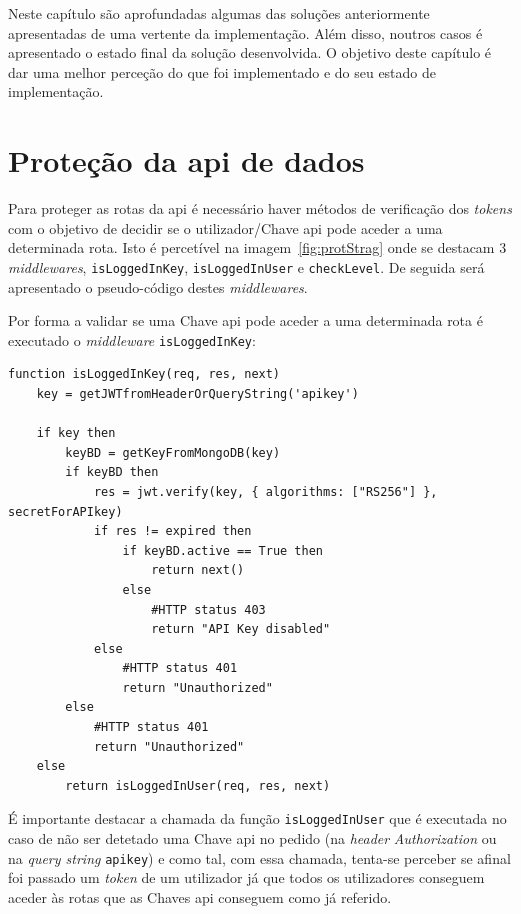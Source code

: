 Neste capítulo são aprofundadas algumas das soluções anteriormente apresentadas de uma vertente da implementação. Além disso, noutros casos é apresentado o estado final da solução desenvolvida. O objetivo deste capítulo é dar uma melhor perceção do que foi implementado e do seu estado de implementação.

\section{Proteção da \acrshort{api} de dados}

Para proteger as rotas da \acrshort{api} é necessário haver métodos de verificação dos \textit{tokens} com o objetivo de decidir se o utilizador/Chave \acrshort{api} pode aceder a uma determinada rota. Isto é percetível na imagem~\ref{fig:protStrag} onde se destacam 3 \textit{middlewares}, \texttt{isLoggedInKey}, \texttt{isLoggedInUser} e \texttt{checkLevel}. De seguida será apresentado o pseudo-código destes \textit{middlewares}. 

Por forma a validar se uma Chave \acrshort{api} pode aceder a uma determinada rota é executado o \textit{middleware} \texttt{isLoggedInKey}:
\begin{lstlisting}[language=pseudocode, caption=Verificação se um pedido com uma determinada Chave \acrshort{api} pode ser efetuado]
function isLoggedInKey(req, res, next)
    key = getJWTfromHeaderOrQueryString('apikey')

    if key then
        keyBD = getKeyFromMongoDB(key)
        if keyBD then
            res = jwt.verify(key, { algorithms: ["RS256"] }, secretForAPIkey)
            if res != expired then
                if keyBD.active == True then
                    return next()
                else
                    #HTTP status 403
                    return "API Key disabled"
            else
                #HTTP status 401
                return "Unauthorized"
        else
            #HTTP status 401
            return "Unauthorized"
    else
        return isLoggedInUser(req, res, next)
\end{lstlisting}
É importante destacar a chamada da função \texttt{isLoggedInUser} que é executada no caso de não ser detetado uma Chave \acrshort{api} no pedido (na \textit{header} \textit{Authorization} ou na \textit{query string} \texttt{apikey}) e como tal, com essa chamada, tenta-se perceber se afinal foi passado um \textit{token} de um utilizador já que todos os utilizadores conseguem aceder às rotas que as Chaves \acrshort{api} conseguem como já referido.

